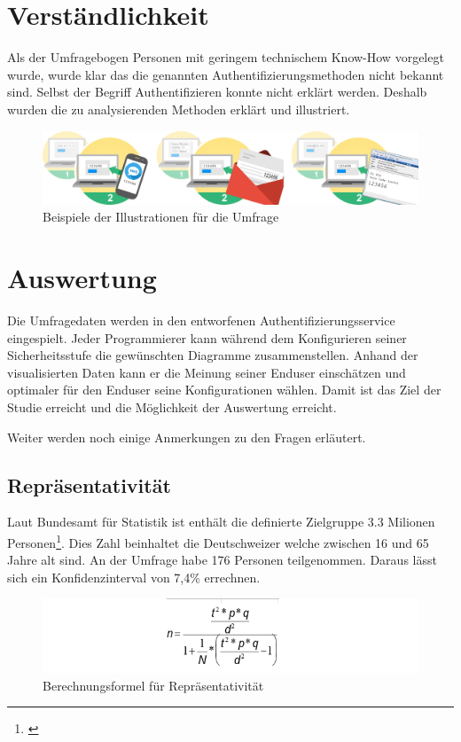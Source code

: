 \section{Verständlichkeit}\label{verstuxe4ndlichkeit}

Als der Umfragebogen Personen mit geringem technischem Know-How
vorgelegt wurde, wurde klar das die genannten Authentifizierungsmethoden
nicht bekannt sind. Selbst der Begriff Authentifizieren konnte nicht
erklärt werden. Deshalb wurden die zu analysierenden Methoden erklärt
und illustriert.

\begin{figure}[htbp]
\centering
\includegraphics{images/studien-ilustrationen.jpg}
\caption{Beispiele der Illustrationen für die Umfrage}
\end{figure}

\section{Auswertung}\label{auswertung}

Die Umfragedaten werden in den entworfenen Authentifizierungsservice
eingespielt. Jeder Programmierer kann während dem Konfigurieren seiner
Sicherheitsstufe die gewünschten Diagramme zusammenstellen. Anhand der
visualisierten Daten kann er die Meinung seiner Enduser einschätzen und
optimaler für den Enduser seine Konfigurationen wählen. Damit ist das
Ziel der Studie erreicht und die Möglichkeit der Auswertung erreicht.

Weiter werden noch einige Anmerkungen zu den Fragen erläutert.

\subsection{Repräsentativität}\label{repruxe4sentativituxe4t}

Laut Bundesamt für Statistik ist enthält die definierte Zielgruppe 3.3
Milionen Personen\footnote{\autocite{bfs}}. Dies Zahl beinhaltet die
Deutschweizer welche zwischen 16 und 65 Jahre alt sind. An der Umfrage
habe 176 Personen teilgenommen. Daraus lässt sich ein Konfidenzinterval
von 7,4\% errechnen.

\begin{figure}[htbp]
\centering
\includegraphics{images/repraesentativitaet.png}
\caption{Berechnungsformel für Repräsentativität}
\end{figure}


